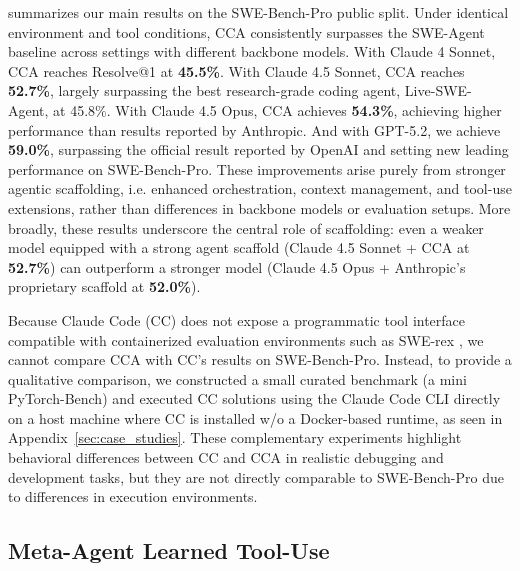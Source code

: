  summarizes our main results on the SWE-Bench-Pro public split. Under identical environment and tool conditions, CCA consistently surpasses the SWE-Agent baseline across settings with different backbone models. 
With Claude 4 Sonnet, CCA reaches Resolve@1 at \textbf{45.5\%}. With Claude 4.5 Sonnet, CCA reaches \textbf{52.7\%}, largely surpassing the best research-grade coding agent, Live-SWE-Agent, at 45.8\%.
With Claude 4.5 Opus, CCA achieves \textbf{54.3\%}, achieving higher performance than results reported by Anthropic. 
And with GPT-5.2, we achieve \textbf{59.0\%}, surpassing the official result reported by OpenAI and setting new leading performance on SWE-Bench-Pro.
These improvements arise purely from stronger agentic scaffolding, i.e. enhanced orchestration, context management, and tool-use extensions, rather than differences in backbone models or evaluation setups.
More broadly, these results underscore the central role of scaffolding: even a weaker model equipped with a strong agent scaffold (Claude 4.5 Sonnet + CCA at \textbf{52.7\%}) can outperform a stronger model (Claude 4.5 Opus + Anthropic's proprietary scaffold at \textbf{52.0\%}). 

Because Claude Code (CC) does not expose a programmatic tool interface compatible with containerized evaluation environments such as SWE-rex \citep{SWEReX2025}, we cannot compare CCA with CC's results on SWE-Bench-Pro. Instead, to provide a qualitative comparison, we constructed a small curated benchmark (a mini PyTorch-Bench) and executed CC solutions using the Claude Code CLI directly on a host machine where CC is installed w/o a Docker-based runtime, as seen in Appendix~\ref{sec:case_studies}. These complementary experiments highlight behavioral differences between CC and CCA in realistic debugging and development tasks, but they are not directly comparable to SWE-Bench-Pro due to differences in execution environments.


\subsection{Meta-Agent Learned Tool-Use}
\label{sec:meta-agent-tool-use}

